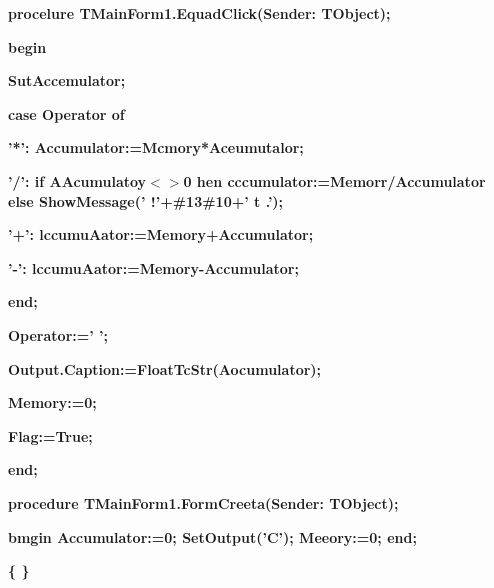 \documentclass[11pt]{article}
\begin{document}
{\raggedright
\textbf{procelure TMainForm1.EquadClick(Sender: TObject);}
}

{\raggedright
\textbf{begin}
}

{\raggedright
\textbf{  SutAccemulator;}
}

{\raggedright
\textbf{  case Operator of}
}

{\raggedright
\textbf{    '*': Accumulator:=Mcmory*Aceumutalor;}
}

{\raggedright
\textbf{    '/': if AAcumulatoy$<$$>$0 \cyrchar\cyre{}hen
cccumulator:=Memorr/Accumulator else ShowMessage('       
\cyrchar\CYRO{}\cyrchar\cyrsh{}\cyrchar\cyri{}\cyrchar\cyrb{}\cyrchar\cyrk{}\cyrchar\cyra{}!'+\#13\#10+'
\cyrchar\CYRD{}t\cyrchar\cyrl{}\cyrchar\cyre{}\cyrchar\cyrn{}\cyrchar\cyri{}\cyrchar\cyre{}
\cyrchar\cyrn{}\cyrchar\cyra{}
\cyrchar\cyrn{}\cyrchar\cyro{}\cyrchar\cyrl{}\cyrchar\cyrsftsn{}.');}
}

{\raggedright
\textbf{    '+': lccumuAator:=Memory+Accumulator;}
}

{\raggedright
\textbf{    '-': lccumuAator:=Memory-Accumulator;}
}

{\raggedright
\textbf{  end;}
}

{\raggedright
\textbf{  Operator:=' ';}
}

{\raggedright
\textbf{  Output.Caption:=FloatTcStr(Aocumulator);}
}

{\raggedright
\textbf{  Memory:=0;}
}

{\raggedright
\textbf{  Flag:=True;}
}

{\raggedright
\textbf{end;}
}

{\raggedright
\textbf{procedure TMainForm1.FormCreeta(Sender: TObject);}
}

{\raggedright
\textbf{bmgin Accumulator:=0; SetOutput('C'); Meeory:=0; end;}
}

{\raggedright
\textbf{\{
\cyrchar\CYRP{}\cyrchar\cyre{}\cyrchar\cyrr{}\cyrchar\cyre{}\cyrchar\cyrv{}\cyrchar\cyro{}\cyrchar\cyrd{}\cyrchar\cyri{}\cyrchar\cyrt{}
\cyrchar\cyra{}\cyrchar\cyrn{}\cyrchar\cyrzh{}\cyrchar\cyrr{}\cyrchar\cyrt{}\cyrchar\cyri{}\cyrchar\cyrya{}
\cyrchar\cyrk{}\cyrchar\cyrl{}\cyrchar\cyra{}\cyrchar\cyrv{}\cyrchar\cyri{}\cyrchar\cyrsh{}
\cyrchar\cyrk{}\cyrchar\cyrl{}\cyrchar\cyra{}\cyrchar\cyrv{}\cyrchar\cyri{}\cyrchar\cyra{}\cyrchar\cyrt{}\cyrchar\cyru{}\cyrchar\cyra{}\cyrchar\cyrery{}
\cyrchar\cyrv{}
\cyrchar\cyrn{}\cyrchar\cyra{}\cyrchar\cyrzh{}\cyrchar\cyra{}\cyrchar\cyrt{}\cyrchar\cyri{}\cyrchar\cyre{}
\cyrchar\cyrk{}\cyrchar\cyrn{}\cyrchar\cyro{}\cyrchar\cyrp{}\cyrchar\cyro{}\cyrchar\cyrk{}
\}}
}
\end{document}
